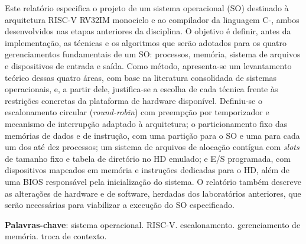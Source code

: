 \documentclass[
	12pt,				%
	openright,			%
	a4paper,			%
	english,			%
	french,				%
	spanish,			%
	brazilian,				%
	]{abntex2}
\begin{document}

\frenchspacing 


\imprimircapa

\imprimirfolhaderosto*

\setlength{\absparsep}{18pt} %
\begin{resumo}
Este relatório especifica o projeto de um sistema operacional (SO) destinado à
arquitetura RISC-V RV32IM monociclo e ao compilador da linguagem C-, ambos
desenvolvidos nas etapas anteriores da disciplina. O objetivo é definir, antes da
implementação, as técnicas e os algoritmos que serão adotados para os quatro
gerenciamentos fundamentais de um SO: processos, memória, sistema de arquivos e
dispositivos de entrada e saída. Como método, apresenta-se um levantamento teórico
dessas quatro áreas, com base na literatura consolidada de sistemas operacionais, e,
a partir dele, justifica-se a escolha de cada técnica frente às restrições concretas
da plataforma de hardware disponível. Definiu-se o escalonamento circular (\emph{round-robin}) com preempção por
temporizador e mecanismo de interrupção adaptado à arquitetura; o particionamento
fixo das memórias de dados e de instrução, com uma partição para o SO e uma para
cada um dos até dez processos; um sistema de arquivos de alocação contígua com
\emph{slots} de tamanho fixo e tabela de diretório no HD emulado; e E/S programada,
com dispositivos mapeados em memória e instruções dedicadas para o HD, além de uma
BIOS responsável pela inicialização do sistema. O relatório também descreve as
alterações de hardware e de software, herdadas dos laboratórios anteriores, que serão
necessárias para viabilizar a execução do SO especificado.

\noindent
\textbf{Palavras-chave}: sistema operacional. RISC-V. escalonamento. gerenciamento de memória. troca de contexto.
\end{resumo}

\listoffigures*
\clearpage
\end{document}
